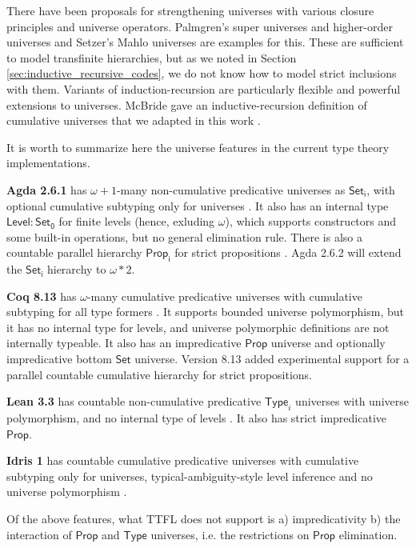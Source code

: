 \documentclass[a4paper,UKenglish,cleveref, autoref, thm-restate]{lipics-v2021}
\theoremstyle{remark}
\theoremstyle{definition}
\newcommand{\Set}[1]{\mathsf{Set_{#1}}}
\newcommand{\Seti}{\mathsf{Set}}
\newcommand{\msf}[1]{\mathsf{#1}}
\begin{document}
There have been proposals for strengthening universes with various closure
principles and universe operators. Palmgren's super universes and higher-order
universes \cite{Palmgren98onuniverses} and Setzer's Mahlo universes
\cite{setzer00mahlo} are examples for this. These are sufficient to model
transfinite hierarchies, but as we noted in Section
\ref{sec:inductive_recursive_codes}, we do not know how to model strict
inclusions with them. Variants of induction-recursion \cite{dybjer99finite,
  indexedir, positiveir} are particularly flexible and powerful extensions to
universes. McBride gave an inductive-recursion definition of cumulative
universes that we adapted in this work \cite{mcbride2015datatypes}.

It is worth to summarize here the universe features in the current
type theory implementations.

\textbf{Agda 2.6.1} has $\omega+1$-many non-cumulative predicative universes as
$\Set{i}$, with optional cumulative subtyping only for universes
\cite{agdadocs}.  It also has an internal type $\msf{Level} : \Set0$ for finite
levels (hence, exluding $\omega$), which supports constructors and some built-in
operations, but no general elimination rule. There is also a countable parallel
hierarchy $\msf{Prop_i}$ for strict propositions \cite{sprop}. Agda 2.6.2 will
extend the $\Set{i}$ hierarchy to $\omega * 2$.

\textbf{Coq 8.13} has $\omega$-many cumulative predicative universes with
cumulative subtyping for all type formers \cite{timany18cumulative}. It supports
bounded universe polymorphism, but it has no internal type for levels, and
universe polymorphic definitions are not internally typeable. It also has an
impredicative $\msf{Prop}$ universe and optionally impredicative bottom $\Seti$
universe. Version 8.13 added experimental support for a parallel
countable cumulative hierarchy for strict propositions.

\textbf{Lean 3.3} has countable non-cumulative predicative $\msf{Type}_i$
universes with universe polymorphism, and no internal type of levels
\cite{leanmanual}. It also has strict impredicative $\msf{Prop}$.

\textbf{Idris 1} has countable cumulative predicative universes with cumulative
subtyping only for universes, typical-ambiguity-style level inference and no
universe polymorphism \cite{idrisdocs}.

Of the above features, what TTFL does not support is a) impredicativity b) the
interaction of $\msf{Prop}$ and $\msf{Type}$ universes, i.e. the restrictions on
$\msf{Prop}$ elimination.
\end{document}
